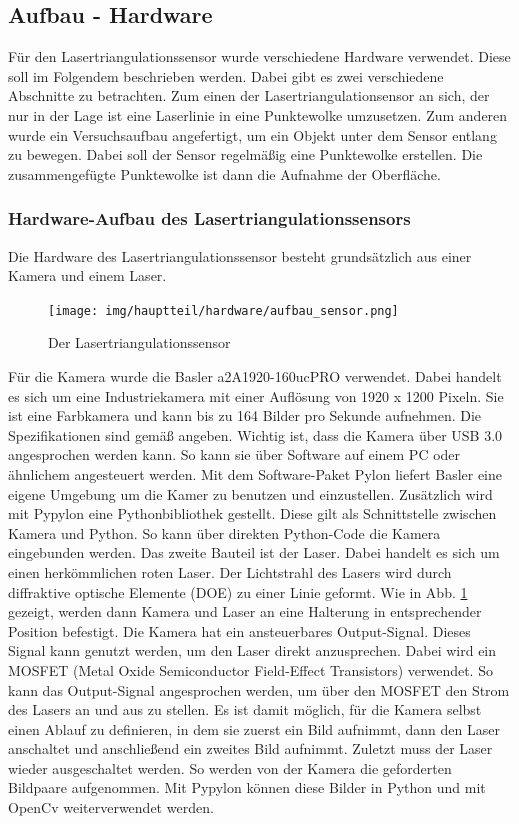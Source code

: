 	\newpage
	
	\subsection{Aufbau - Hardware}
	Für den Lasertriangulationssensor wurde verschiedene Hardware verwendet. Diese soll im Folgendem beschrieben werden. Dabei gibt es zwei verschiedene Abschnitte zu betrachten. Zum einen der Lasertriangulationsensor an sich, der nur in der Lage ist eine Laserlinie in eine Punktewolke umzusetzen. Zum anderen wurde ein Versuchsaufbau angefertigt, um ein Objekt unter dem Sensor entlang zu bewegen. Dabei soll der Sensor regelmäßig eine Punktewolke erstellen. Die zusammengefügte Punktewolke ist dann die Aufnahme der Oberfläche. 
	
		\subsubsection{Hardware-Aufbau des Lasertriangulationssensors}
		Die Hardware des Lasertriangulationssensor besteht grundsätzlich aus einer Kamera und einem Laser.
		
		\begin{figure}[h]
			\centering
			\texttt{[image: img/hauptteil/hardware/aufbau\_sensor.png]}
			\caption{Der Lasertriangulationssensor}
			\label{fig:aufbau_sensor}
		\end{figure}
		Für die Kamera wurde die Basler a2A1920-160ucPRO verwendet. Dabei handelt es sich um eine Industriekamera mit einer Auflösung von 1920 x 1200 Pixeln. Sie ist eine Farbkamera und kann bis zu 164 Bilder pro Sekunde aufnehmen. Die Spezifikationen sind gemäß \citep{noauthor_a2a1920-160ucpro_nodate} angeben. Wichtig ist, dass die Kamera über USB 3.0 angesprochen werden kann. So kann sie über Software auf einem PC oder ähnlichem angesteuert werden. Mit dem Software-Paket Pylon liefert Basler eine eigene Umgebung um die Kamer zu benutzen und einzustellen. Zusätzlich wird mit Pypylon eine Pythonbibliothek gestellt. Diese gilt als Schnittstelle zwischen Kamera und Python. So kann über direkten Python-Code die Kamera eingebunden werden. \newline
		Das zweite Bauteil ist der Laser. Dabei handelt es sich um einen herkömmlichen roten Laser. Der Lichtstrahl des Lasers wird durch diffraktive optische Elemente (DOE) zu einer Linie geformt. Wie in Abb. \ref{fig:aufbau_sensor} gezeigt, werden dann Kamera und Laser an eine Halterung in entsprechender Position befestigt. \newline
		Die Kamera hat ein ansteuerbares Output-Signal. Dieses Signal kann genutzt werden, um den Laser direkt anzusprechen. Dabei wird ein MOSFET (Metal Oxide Semiconductor Field-Effect Transistors) verwendet. So kann das Output-Signal angesprochen werden, um über den MOSFET den Strom des Lasers an und aus zu stellen. Es ist damit möglich, für die Kamera selbst einen Ablauf zu definieren, in dem sie zuerst ein Bild aufnimmt, dann den Laser anschaltet und anschließend ein zweites Bild aufnimmt. Zuletzt muss der Laser wieder ausgeschaltet werden. So werden von der Kamera die geforderten Bildpaare aufgenommen. Mit Pypylon können diese Bilder in Python und mit OpenCv weiterverwendet werden.
		
